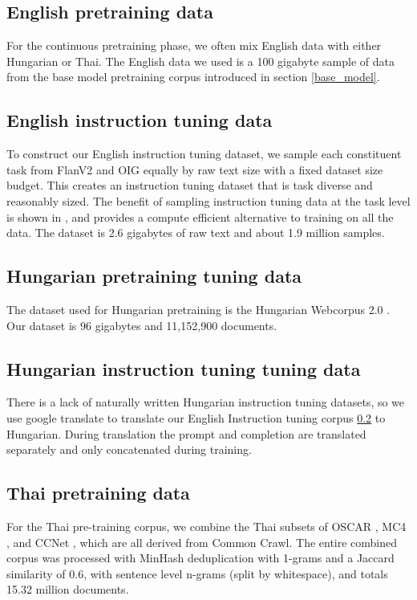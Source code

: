 \subsection{English pretraining data} \label{english pretraining data}
For the continuous pretraining phase, we often mix English data with either Hungarian or Thai. The English data we used is a 100 gigabyte sample of data from the base model pretraining corpus introduced in section \ref{base_model}.

\subsection{English instruction tuning data} \label{english instruction tuning data}
To construct our English instruction tuning dataset, we sample each constituent task from FlanV2 \cite{longpre2023flan} and OIG \cite{Nguyen_2023} equally by raw text size with a fixed dataset size budget. This creates an instruction tuning dataset that is task diverse and reasonably sized. The benefit of sampling instruction tuning data at the task level is shown in  \cite{iyer2023optiml}, and provides a compute efficient alternative to training on all the data. The dataset is 2.6 gigabytes of raw text and about 1.9 million samples.

\subsection{Hungarian pretraining tuning data}\label{hungarian pretraining data}
The dataset used for Hungarian pretraining is the Hungarian Webcorpus 2.0 \cite{Nemeskey:2020}. Our dataset is 96 gigabytes and 11,152,900 documents.

\subsection{Hungarian instruction tuning tuning data}\label{hungarian instruction tuning data}
 There is a lack of naturally written Hungarian instruction tuning datasets, so we use google translate to translate our English Instruction tuning corpus \ref{english instruction tuning data} to Hungarian. During translation the prompt and completion are translated separately and only concatenated during training. 

\subsection{Thai pretraining data}\label{thai pretraining corpus}
For the Thai pre-training corpus, we combine the Thai subsets of OSCAR \cite{abadji2022cleaner}, MC4 \cite{xue-etal-2021-mt5}, and CCNet \cite{wenzek2019ccnet}, which are all derived from Common Crawl. The entire combined corpus was processed with MinHash deduplication \cite{chenghao_mou_2023_8364980, 666900} with 1-grams and a Jaccard similarity of 0.6, with sentence level n-grams (split by whitespace), and totals 15.32 million documents.

